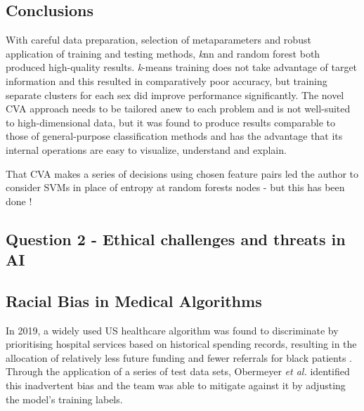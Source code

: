\documentclass[a4paper, 11pt]{article}
\begin{document}
\vspace{\baselineskip}

\subsection*{Conclusions}

With careful data preparation, selection of metaparameters and robust application of training and testing methods, 
\textit{k}nn and random forest both produced high-quality results. 
\textit{k}-means training does not take advantage of target information and this resulted in comparatively poor accuracy, but training
separate clusters for each sex did improve performance significantly.
The novel CVA approach needs to be tailored anew to each problem and is not well-suited to high-dimensional data, 
but it was found to produce results comparable to those of general-purpose classification methods and has the advantage that 
its internal operations are easy to visualize, understand and explain.

That CVA makes a series of decisions using chosen feature pairs 
led the author to consider SVMs in place of entropy at random forests nodes - 
but this has been done \cite{law2003support}!

\vspace{-0.1\baselineskip} %
\begin{center}
\subsection*{Question 2 - Ethical challenges and threats in AI}
\end{center}
\vspace{0.1\baselineskip} %
\subsection*{Racial Bias in Medical Algorithms}

In 2019, a widely used US healthcare algorithm was found to discriminate by prioritising hospital services 
based on historical spending records, resulting in the allocation of relatively less future funding and fewer referrals 
for black patients \cite{Jemielity2019, Ledford2019}. 
Through the application of a series of test data sets, Obermeyer \textit{et al.} \cite{Obermeyer2019} identified this inadvertent bias 
and the team was able to mitigate against it by adjusting the model’s training labels. 
\end{document}
